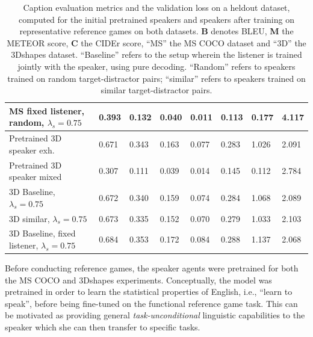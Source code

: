\begin{table}[]
\begin{tabularx}{\textwidth}{|X|l|l|l|l|l|l|l|}
		MS fixed listener, random, $\lambda_s = 0.75$  &        0.393         &       0.132          &        0.040         &      0.011           &      0.113           &        0.177        &       4.117                   \\ \hline
		Pretrained 3D speaker exh.    & 0.671           & 0.343           & 0.163           & 0.077           & 0.283           & 1.026          & 2.091                    \\ \hline
		Pretrained 3D speaker mixed    &  0.307          &  0.111  &  0.039     & 0.014       &  0.145   &    0.112 &    2.784      \\ \hline
		3D Baseline, $\lambda_s = 0.75$  & 0.672           & 0.340           & 0.159           & 0.074           & 0.284           & 1.068          & 2.089                    \\ \hline
		3D similar, $\lambda_s = 0.75$ & 0.673           & 0.335           & 0.152           & 0.070           & 0.279           & 1.033          & 2.103                    \\ \hline
		3D Baseline, fixed listener, $\lambda_s = 0.75$ &      0.684           &   0.353      &    0.172       &     0.084   &      0.288   &     1.137  &     2.068        \\ \hline
	\end{tabularx}
\caption{\label{tab:eval_metrics_refgame} Caption evaluation metrics and the validation loss on a heldout dataset, computed for the initial pretrained speakers and speakers after training on representative reference games on both datasets. \textbf{B} denotes BLEU, \textbf{M} the METEOR score, \textbf{C} the CIDEr score, ``MS'' the MS COCO dataset and ``3D'' the 3Dshapes dataset. ``Baseline'' refers to the setup wherein the listener is trained jointly with the speaker, using pure decoding. ``Random'' refers to speakers trained on random target-distractor pairs; ``similar'' refers to speakers trained on similar target-distractor pairs.}
\end{table}

Before conducting reference games, the speaker agents were pretrained for both the MS COCO and 3Dshapes experiments. Conceptually, the model was pretrained in order to learn the statistical properties of English, i.e., ``learn to speak'', before being fine-tuned on the functional reference game task. This can be motivated as providing general \textit{task-unconditional} linguistic capabilities to the speaker which she can then transfer to specific tasks.

